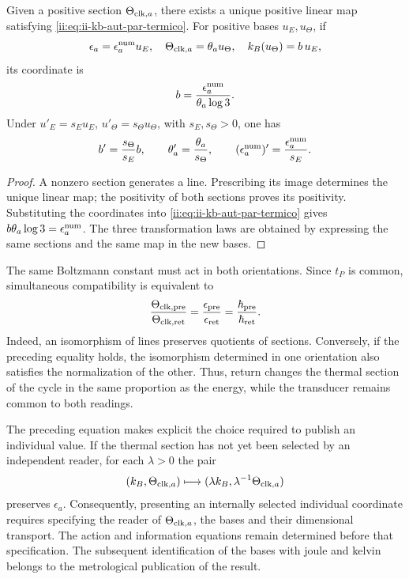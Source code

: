 \begin{theorem}
Given a positive section \(\Theta_{{\rm clk},a}\), there exists a
unique positive linear map satisfying
\eqref{ii:eq:ii-kb-aut-par-termico}. For positive bases \(u_E,u_\Theta\),
if
\[
 \epsilon_a=\epsilon_a^{\rm num}u_E,\quad
 \Theta_{{\rm clk},a}=\theta_a u_\Theta,\quad
 k_B(u_\Theta)=b\,u_E,
\]
its coordinate is
\begin{equation}
 b=\frac{\epsilon_a^{\rm num}}{\theta_a\log3}.
 \label{ii:eq:ii-kb-aut-coordenada}
\end{equation}
Under \(u'_E=s_Eu_E\), \(u'_\Theta=s_\Theta u_\Theta\), with
\(s_E,s_\Theta>0\), one has
\[
 b'=\frac{s_\Theta}{s_E}b,\qquad
 \theta'_a=\frac{\theta_a}{s_\Theta},\qquad
 (\epsilon_a^{\rm num})'=\frac{\epsilon_a^{\rm num}}{s_E}.
\]
\end{theorem}
\begin{proof}
A nonzero section generates a line. Prescribing its image determines
the unique linear map; the positivity of both sections proves
its positivity. Substituting the coordinates into
\eqref{ii:eq:ii-kb-aut-par-termico} gives
\(b\theta_a\log3=\epsilon_a^{\rm num}\). The three transformation
laws are obtained by expressing the same sections and the same
map in the new bases.
\end{proof}

The same Boltzmann constant must act in both orientations.
Since \(t_P\) is common, simultaneous compatibility is equivalent to
\begin{equation}
 \frac{\Theta_{{\rm clk},{\rm pre}}}{\Theta_{{\rm clk},{\rm ret}}}
 =\frac{\epsilon_{\rm pre}}{\epsilon_{\rm ret}}
 =\frac{\hbar_{\rm pre}}{\hbar_{\rm ret}}.
 \label{ii:eq:ii-kb-aut-orientaciones}
\end{equation}
Indeed, an isomorphism of lines preserves quotients of sections.
Conversely, if the preceding equality holds, the isomorphism
determined in one orientation also satisfies the normalization of
the other. Thus, return changes the thermal section of the cycle in the
same proportion as the energy, while the transducer remains
common to both readings.

The preceding equation makes explicit the choice required to publish an
individual value. If the thermal section has not yet been selected
by an independent reader, for each \(\lambda>0\) the pair
\[
 (k_B,\Theta_{{\rm clk},a})
 \longmapsto(\lambda k_B,\lambda^{-1}\Theta_{{\rm clk},a})
\]
preserves \(\epsilon_a\). Consequently, presenting an
internally selected individual coordinate requires specifying the reader of
\(\Theta_{{\rm clk},a}\), the bases and their dimensional transport.
The action and information equations remain determined before
that specification. The subsequent identification of the bases with
joule and kelvin belongs to the metrological publication of the result.

